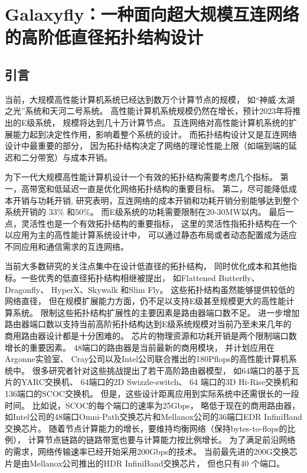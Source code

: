 \chapter{Galaxyfly：一种面向超大规模互连网络的高阶低直径拓扑结构设计}

\section{引言}
当前，大规模高性能计算机系统已经达到数万个计算节点的规模，
如“神威$\cdot$太湖之光”系统和天河二号系统。
高性能计算机系统规模仍然在增长，预计2023年将推出的E级系统，
规模将达到几十万计算节点。
互连网络对高性能计算机系统的扩展能力起到决定性作用，影响着整个系统的设计。
而拓扑结构设计又是互连网络设计中最重要的部分，
因为拓扑结构决定了网络的理论性能上限（如端到端的延迟和二分带宽）与成本开销。

为下一代大规模高性能计算机设计一个有效的拓扑结构需要考虑几个指标。
第一，高带宽和低延迟一直是优化网络拓扑结构的重要目标。
第二，尽可能降低成本开销与功耗开销,
研究表明，互连网络的成本开销和功耗开销分别能够达到整个系统开销的
$33\%$ 和$50\%$。
而E级系统的功耗需要限制在20-30MW以内。
最后一点，灵活性也是一个有效拓扑结构的重要指标，
这里的灵活性指拓扑结构在一个以应用为主的高性能计算系统设计中，
可以通过静态布局或者动态配置成为适应不同应用和通信需求的互连网络。

当前大多数研究的关注点集中在设计低直径的拓扑结构，
同时优化成本和其他指标。一些优秀的低直径拓扑结构相继被提出，
如Flattened Butterfly、Dragonfly、
HyperX、Skywalk 和Slim Fly。
这些拓扑结构虽然能够提供较低的网络直径，
但在规模扩展能力方面，仍不足以支持E级甚至规模更大的高性能计算系统。
限制这些拓扑结构扩展性的主要因素是路由器端口数不足。
进一步增加路由器端口数以支持当前高阶拓扑结构达到E级系统规模对当前乃至未来几年的
商用路由器设计都是十分困难的。
芯片的物理资源和功耗开销是两个限制端口数增长的重要因素。
48端口的路由器是当前最新的商用模块，
并计划应用在Argonne实验室、
Cray公司以及Intel公司联合推出的180Pflops的高性能计算机系统中。
很多研究者针对这些挑战提出了若干高阶路由器模型，
如64端口的基于瓦片的YARC交换机、
64端口的2D Swizzle-switch、
64 端口的3D Hi-Rise交换机和136端口的SCOC交换机。
但是，这些设计距离应用到实际系统中还需很长的一段时间。
比如说，SCOC的每个端口的速率为25Gbps，
略低于现在的商用路由器，
如Intel公司的48端口Omni-Path交换芯片和Mellanox公司的36端口EDR InfiniBand交换芯片。
随着节点计算能力的增长，要维持均衡网络（保持bytes-to-flops的比例），
计算节点链路的链路带宽也要与计算能力按比例增长。
为了满足前沿网络的需求，网络传输速率已经开始采用200Gbps的技术。
当前最先进的200G交换芯片是由Mellanox公司推出的HDR InfiniBand交换芯片，
但也只有40 个端口。

